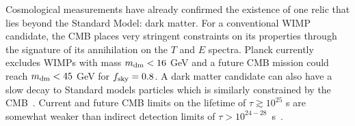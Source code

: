 %

Cosmological measurements have already confirmed the existence of one relic that lies beyond the 
Standard Model: dark matter. For a conventional WIMP candidate, the CMB places very stringent 
constraints on its properties through the signature of its annihilation on the $T$ and $E$ 
spectra\citep{Peebles2000, Chen2004, Padmanabhan2005}.  Planck currently excludes WIMPs with mass $m_{\rm dm}< 16$ GeV and a future CMB mission could reach $m_{\rm dm} < 45$ GeV for $f_{\rm sky} =0.8$.  
A dark matter candidate can also have a slow decay to Standard models particles which is 
similarly constrained by the CMB~\cite{Chen2004, Zhang2007, Diamanti2014, Slatyer:2016qyl}.  Current and future CMB limits on the lifetime of $\tau \gtrsim 10^{25}$ s are somewhat weaker than indirect detection limits of $\tau > 10^{24-28}$~s~\cite{Essig:2013goa}.  

